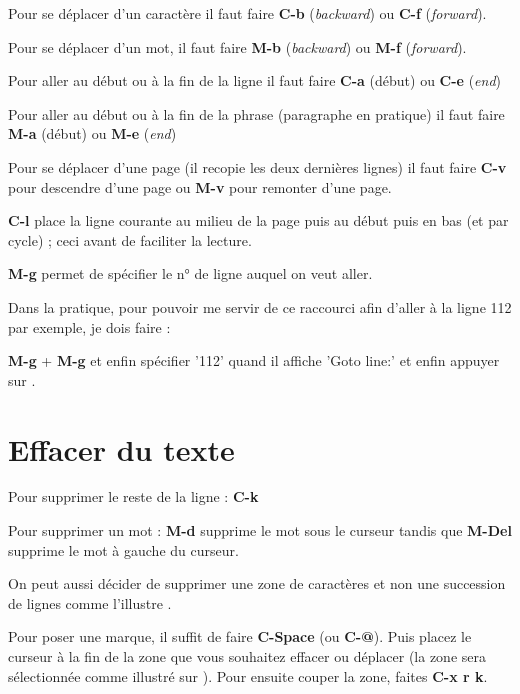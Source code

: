 \documentclass[a4paper,twoside]{article}
\newcommand{\raccourci}[1]{{\bfseries #1}}
\begin{document}
Pour se déplacer d'un caractère il faut faire \raccourci{C-b} (\emph{backward}) ou \raccourci{C-f} (\emph{forward}).

Pour se déplacer d'un mot, il faut faire \raccourci{M-b} (\emph{backward}) ou \raccourci{M-f} (\emph{forward}).

Pour aller au début ou à la fin de la ligne il faut faire \raccourci{C-a} (début) ou \raccourci{C-e} (\emph{end})

Pour aller au début ou à la fin de la phrase (paragraphe en pratique) il faut faire \raccourci{M-a} (début) ou \raccourci{M-e} (\emph{end})

Pour se déplacer d'une page (il recopie les deux dernières lignes) il faut faire \raccourci{C-v} pour descendre d'une page ou \raccourci{M-v} pour remonter d'une page.

\bigskip

\raccourci{C-l} place la ligne courante au milieu de la page puis au début puis en bas (et par cycle) ; ceci avant de faciliter la lecture.

\raccourci{M-g} permet de spécifier le n° de ligne auquel on veut aller. 

\begin{remarque}
Dans la pratique, pour pouvoir me servir de ce raccourci afin d'aller à la ligne 112 par exemple, je dois faire : 

\raccourci{M-g} + \raccourci{M-g} et enfin spécifier '112' quand il affiche 'Goto line:' et enfin appuyer sur .
\end{remarque}


\section{Effacer du texte}
Pour supprimer le reste de la ligne : \raccourci{C-k}

Pour supprimer un mot : \raccourci{M-d} supprime le mot sous le curseur tandis que \raccourci{M-Del} supprime le mot à gauche du curseur.

\bigskip

On peut aussi décider de supprimer une zone de caractères et non une succession de lignes comme l'illustre .

Pour poser une marque, il suffit de faire \raccourci{C-Space} (ou \raccourci{C-@}). Puis placez le curseur à la fin de la zone que vous souhaitez effacer ou déplacer (la zone sera sélectionnée comme illustré sur ). Pour ensuite couper la zone, faites \raccourci{C-x r k}. 
\end{document}
